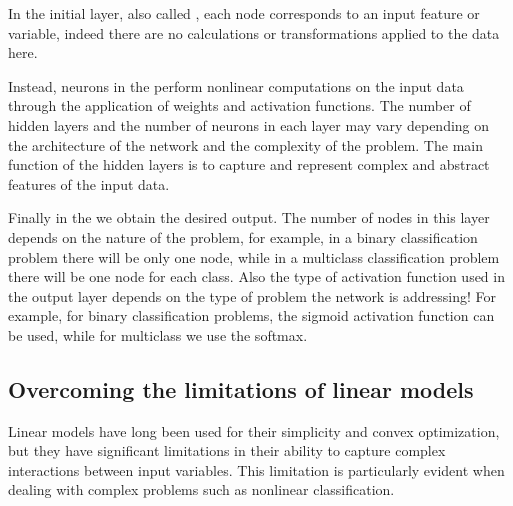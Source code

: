 In the initial layer, also called \textbf{\color{green!60!black}{Input Layer}}, each node corresponds to an input feature or variable, indeed there are no calculations or transformations applied to the data here.

Instead, neurons in the \textbf{\color{mybluee}{Hidden Layers}} perform nonlinear computations on the input data through the application of weights and activation functions.
The number of hidden layers and the number of neurons in each layer may vary depending on the architecture of the network and the complexity of the problem.
The main function of the hidden layers is to capture and represent complex and abstract features of the input data.

Finally in the \textbf{\color{red!80!black}{Output Layer}} we obtain the desired output.
The number of nodes in this layer depends on the nature of the problem, for example, in a binary classification problem there will be only one node, while in a multiclass classification problem there will be one node for each class.
Also the type of activation function used in the output layer depends on the type of problem the network is addressing! For example, for binary classification problems, the sigmoid activation function can be used, while for multiclass we use the softmax.

\subsection{Overcoming the limitations of linear models}

Linear models have long been used for their simplicity and convex optimization, but they have significant limitations in their ability to capture complex interactions between input variables. This limitation is particularly evident when dealing with complex problems such as nonlinear classification.

